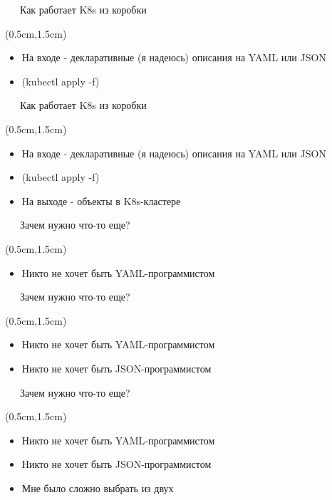 \documentclass[xetex,18pt,aspectratio=43]{beamer}
\begin{document}
\begin{Large}
\begin{frame}{\ \ \ Как работает K8s из коробки}
\begin{textblock*}{\framewidth-0.8cm}(0.5cm,1.5cm)
\begin{itemize}
  \item На входе - декларативные (я надеюсь) описания на YAML или JSON
  \item {\color {red}{\bf Магия!}} (kubectl apply -f)
\end{itemize}
\end{textblock*}
\end{frame}

\begin{frame}{\ \ \ Как работает K8s из коробки}
\begin{textblock*}{\framewidth-0.8cm}(0.5cm,1.5cm)
\begin{itemize}
  \item На входе - декларативные (я надеюсь) описания на YAML или JSON
  \item {\color {red}{\bf Магия!}} (kubectl apply -f)
  \item На выходе - объекты в K8s-кластере
\end{itemize}
\end{textblock*}
\end{frame}

\begin{frame}{\ \ \ Зачем нужно что-то еще?}
\begin{textblock*}{\framewidth-0.8cm}(0.5cm,1.5cm)
\begin{itemize}
  \item Никто не хочет быть YAML-программистом
\end{itemize}
\end{textblock*}
\end{frame}

\begin{frame}{\ \ \ Зачем нужно что-то еще?}
\begin{textblock*}{\framewidth-0.8cm}(0.5cm,1.5cm)
\begin{itemize}
  \item Никто не хочет быть YAML-программистом
  \item Никто не хочет быть JSON-программистом
\end{itemize}
\end{textblock*}
\end{frame}

\begin{frame}{\ \ \ Зачем нужно что-то еще?}
\begin{textblock*}{\framewidth-0.8cm}(0.5cm,1.5cm)
\begin{itemize}
  \item Никто не хочет быть YAML-программистом
  \item Никто не хочет быть JSON-программистом
  \item Мне было сложно выбрать из двух
\end{itemize}
\end{textblock*}
\end{frame}


\end{Large}
\end{document}
